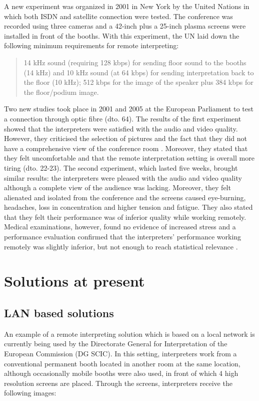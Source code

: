 \documentclass[output=paper]{langsci/langscibook}
\begin{document}
A new experiment was organized in 2001 in New York by the United Nations in which both \textsc{ISDN} and satellite connection were tested. The conference was recorded using three cameras and a 42-inch plus a 25-inch plasma screens were installed in front of the booths. With this experiment, the \textsc{UN} laid down the following minimum requirements for remote interpreting:

\begin{quote}
14 kHz sound (requiring 128 kbps) for sending floor sound to the booths (14 kHz) and 10 kHz sound (at 64 kbps) for sending interpretation back to the floor (10 kHz); 512 kbps for the image of the speaker plus 384 kbps for the floor/podium image.\citep[63]{Mouzourakis2006}
\end{quote}

Two new studies took place in 2001 and 2005 at the European Parliament to test a connection through optic fibre (dto. 64). The results of the first experiment showed that the interpreters were satisfied with the audio and video quality. However, they criticised the selection of pictures and the fact that they did not have a comprehensive view of the conference room \citep[19-21]{Europarl2001}. Moreover, they stated that they felt uncomfortable and that the remote interpretation setting is overall more tiring (dto. 22-23). The second experiment, which lasted five weeks, brought similar results: the interpreters were pleased with the audio and video quality although a complete view of the audience was lacking. Moreover, they felt alienated and isolated from the conference and the screens caused eye-burning, headaches, loss in concentration and higher tension and fatigue. They also stated that they felt their performance was of inferior quality while working remotely. Medical examinations, however, found no evidence of increased stress and a performance evaluation confirmed that the interpreters’ performance working remotely was slightly inferior, but not enough to reach statistical relevance \citep[225-243]{Roziner2010}.

\section{Solutions at present}
\subsection{LAN based solutions} 

An example of a remote interpreting solution which is based on a local network is currently being used by the Directorate General for Interpretation of the European Commission (\textsc{DG SCIC}). In this setting, interpreters work from a conventional permanent booth located in another room at the same location, although occasionally mobile booths were also used, in front of which 4 high resolution screens are placed. Through the screens, interpreters receive the following images:
\end{document}
